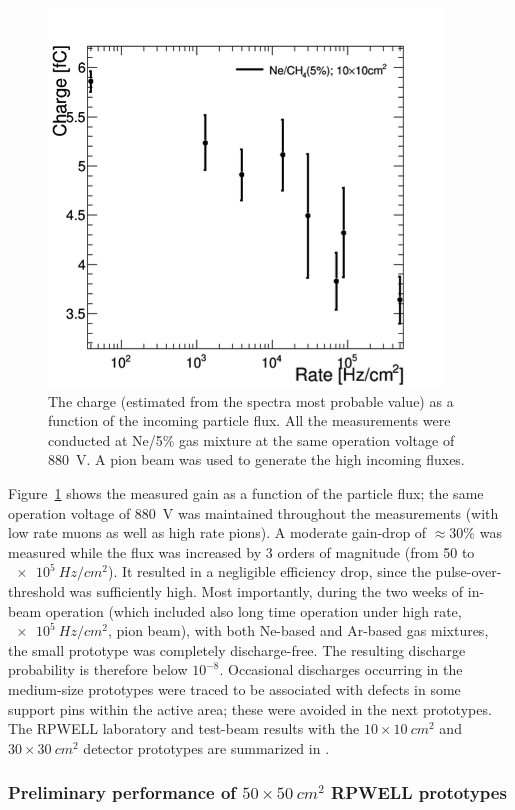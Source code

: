 \begin{figure}
	\centering
	\includegraphics[width=.5\textwidth]{Calorimeter/THGEM/charge_vs_rate.png}
	\caption{The charge (estimated from the spectra most probable value) as a function of the incoming particle flux.  All the measurements were conducted at Ne/5\% gas mixture at the same operation voltage of \SI{880}{V}. A pion beam was used to generate the high incoming fluxes.}
	\label{fig:Calorimeter:THGEM:chargeVsRate}
\end{figure}
Figure~\ref{fig:Calorimeter:THGEM:chargeVsRate} shows the measured gain as a function of the particle flux; the same operation voltage of \SI{880}{V} was maintained throughout the measurements (with low rate muons as well as high rate pions). A moderate gain-drop of $\approx 30\%$ was measured while the flux was increased by 3 orders of magnitude (from 50 to $\SI{e5}{Hz/cm^2}$). It resulted in a negligible efficiency drop, since the pulse-over-threshold was sufficiently high.
Most importantly, during the two weeks of in-beam operation (which included also long time operation under high rate, $\SI{e5}{Hz/cm^2}$, pion beam), with both Ne-based and Ar-based gas mixtures, the small prototype was completely discharge-free. The resulting discharge probability is therefore below $10^{-8}$. Occasional discharges occurring in the medium-size prototypes were traced to be associated with defects in some support pins within the active area; these were avoided in the next prototypes.
The RPWELL laboratory and test-beam results with the $\SI{10}\times\SI{10}{cm^2}$ and $\SI{30}\times\SI{30}{cm^2}$ detector prototypes are summarized in \cite{Moleri:2016hgk,Moleri:2016bjv}.

\subsubsection{Preliminary performance of $\SI{50}\times\SI{50}{cm^2}$ RPWELL prototypes}

